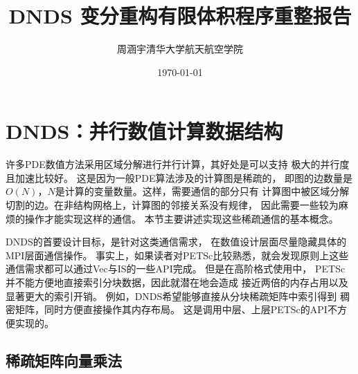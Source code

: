 \documentclass[UTF8,zihao=5]{ctexart} %
\title{{\bfseries\rmfamily\Huge{DNDS 变分重构有限体积程序重整报告}}}
\author{周涵宇\hspace{2em}清华大学航天航空学院}
\date{\today}
\begin{document}
\maketitle
\thispagestyle{empty}
\newpage

\begin{center}
    \rmfamily
    \tableofcontents\setcounter{page}{0}
\end{center}
\thispagestyle{empty}
\newpage



\section{DNDS：并行数值计算数据结构}

许多PDE数值方法采用区域分解进行并行计算，其好处是可以支持
极大的并行度且加速比较好。
这是因为一般PDE算法涉及的计算图是稀疏的，
即图的边数量是$O(N)$，$N$是计算的变量数量。这样，需要通信的部分只有
计算图中被区域分解切割的边。在非结构网格上，计算图的邻接关系没有规律，
因此需要一些较为麻烦的操作才能实现这样的通信。
本节主要讲述实现这些稀疏通信的基本概念。

DNDS的首要设计目标，是针对这类通信需求，
在数值设计层面尽量隐藏具体的MPI层面通信操作。
事实上，如果读者对PETSc\cite{petsc-web-page}比较熟悉，就会发现原则上这些
通信需求都可以通过Vec与IS的一些API完成。
但是在高阶格式使用中，
PETSc并不能方便地直接索引分块数据，因此就潜在地会造成
接近两倍的内存占用以及显著更大的索引开销。
例如，DNDS希望能够直接从分块稀疏矩阵中索引得到
稠密矩阵，同时方便直接操作其内存布局。
这是调用中层、上层PETSc的API不方便实现的。




\subsection{稀疏矩阵向量乘法}
\label{ssec:sparse_mat}
\end{document}
